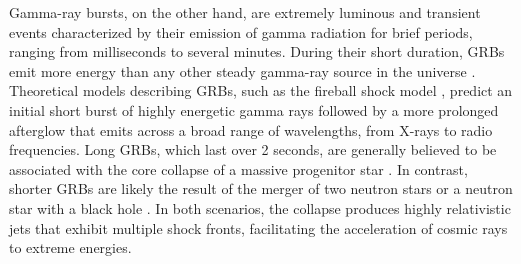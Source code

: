 Gamma-ray bursts, on the other hand, are extremely luminous and transient events characterized by their emission of gamma radiation for brief periods, ranging from milliseconds to several minutes. During their short duration, GRBs emit more energy than any other steady gamma-ray source in the universe \cite{AGN_picture}. Theoretical models describing GRBs, such as the fireball shock model , predict an initial short burst of highly energetic gamma rays followed by a more prolonged afterglow that emits across a broad range of wavelengths, from X-rays to radio frequencies. Long GRBs, which last over 2 seconds, are generally believed to be associated with the core collapse of a massive progenitor star . In contrast, shorter GRBs are likely the result of the merger of two neutron stars or a neutron star with a black hole . In both scenarios, the collapse produces highly relativistic jets that exhibit multiple shock fronts, facilitating the acceleration of cosmic rays to extreme energies.



